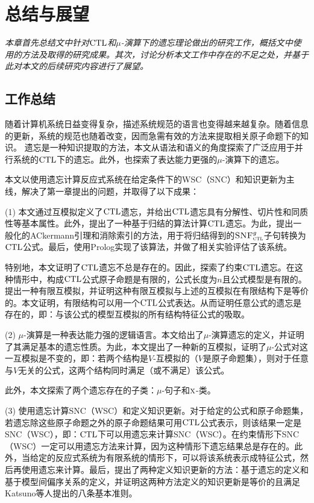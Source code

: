 \chapter{总结与展望}\label{chapter09}
{\em 本章首先总结文中针对$\textrm{CTL}$和$\mu$-演算下的遗忘理论做出的研究工作，概括文中使用的方法及取得的研究成果。其次，讨论分析本文工作中存在的不足之处，并基于此对本文的后续研究内容进行了展望。}

\section{工作总结}
随着计算机系统日益变得复杂，描述系统规范的语言也变得越来越复杂。随着信息的更新，系统的规范也随着改变，因而急需有效的方法来提取相关原子命题下的知识。
遗忘是一种知识提取的方法，本文从语法和语义的角度探索了广泛应用于并行系统的$\textrm{CTL}$下的遗忘。此外，也探索了表达能力更强的$\mu$-演算下的遗忘。

本文以使用遗忘计算反应式系统在给定条件下的WSC（SNC）和知识更新为主线，解决了第一章提出的问题，并取得了以下成果：

(1) 本文通过互模拟定义了$\textrm{CTL}$遗忘，并给出$\textrm{CTL}$遗忘具有分解性、切片性和同质性等基本属性。此外，提出了一种基于归结的算法计算$\textrm{CTL}$遗忘。为此，提出一般化的ACkermann引理和消除索引的方法，用于将归结得到的${\textsc{SNF}_{\textsc{ctl}}^g}$子句转换为$\textrm{CTL}$公式。最后，使用Prolog实现了该算法，并做了相关实验评估了该系统。

特别地，本文证明了$\textrm{CTL}$遗忘不总是存在的。因此，探索了约束$\textrm{CTL}$遗忘。在这种情形中，构成$\textrm{CTL}$公式原子命题是有限的，公式长度为$n$且公式模型是有限的。提出一种有限互模拟，并证明这种有限互模拟与上述的互模拟在有限结构下是等价的。本文证明，有限结构可以用一个$\textrm{CTL}$公式表达。从而证明任意公式的遗忘是存在的，即：与该公式的模型互模拟的所有结构特征公式的吸取。

(2) $\mu$-演算是一种表达能力强的逻辑语言。本文给出了$\mu$-演算遗忘的定义，并证明了其满足基本的遗忘性质。为此，本文提出了一种新的互模拟，证明了$\mu$-公式对这一互模拟是不变的，即：若两个结构是$V$-互模拟的（$V$是原子命题集），则对于任意与$V$无关的公式，这两个结构同时满足（或不满足）该公式。

此外，本文探索了两个遗忘存在的子类：$\mu$-句子和$\textsc{x}$-类。

(3) 使用遗忘计算SNC（WSC）和定义知识更新。对于给定的公式和原子命题集，若遗忘除这些原子命题之外的原子命题结果可用$\textrm{CTL}$公式表示，则该结果一定是SNC（WSC），即：$\textrm{CTL}$下可以用遗忘来计算SNC（WSC）。在约束情形下SNC（WSC）一定可以用遗忘方法来计算，因为这种情形下遗忘结果总是存在的。此外，当给定的反应式系统为有限系统的情形下，可以将该系统表示成特征公式，然后再使用遗忘来计算。最后，提出了两种定义知识更新的方法：基于遗忘的定义和基于模型间偏序关系的定义，并证明这两种方法定义的知识更新是等价的且满足Katsuno等人提出的八条基本准则。

